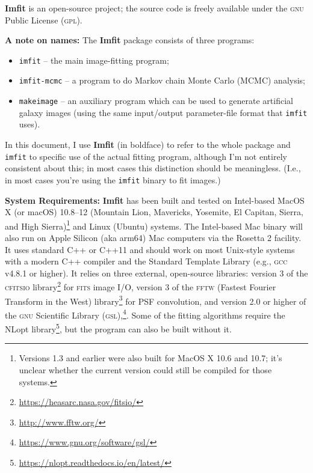 \documentclass[10pt,a4paper,article]{memoir}
\newcommand{\imfit}{\textbf{Imfit}}
\newcommand{\Imfit}{\textbf{Imfit}}
\newcommand{\imfitprog}{\texttt{imfit}}
\newcommand{\imfitmcmc}{\texttt{imfit-mcmc}}
\newcommand{\makeimage}{\texttt{makeimage}}
\begin{document}
\Imfit{} is an open-source project; the source code is freely available
under the \textsc{gnu} Public License (\textsc{gpl}).


\bigskip

\textbf{A note on names:} The \imfit{} package consists of three programs:
\begin{itemize}
\item \imfitprog{} -- the main image-fitting program; \\
\item \imfitmcmc{} -- a program to do Markov chain Monte Carlo (MCMC) analysis; \\
\item \makeimage{} -- an auxiliary program which can be used to
generate artificial galaxy images (using the same input/output
parameter-file format that \imfitprog{} uses). \\
\end{itemize}
In this document, I use \imfit{} (in boldface) to refer to the whole
package and \imfitprog{} to specific use of the actual fitting program,
although I'm not entirely consistent about this; in most cases this
distinction should be meaningless. (I.e., in most cases you're using the
\imfitprog{} binary to fit images.)


\bigskip

\textbf{System Requirements:} \Imfit{} has been built and tested on
Intel-based MacOS X (or macOS) 10.8--12 (Mountain Lion, Mavericks,
Yosemite, El Capitan, Sierra, and High Sierra)\footnote{Versions 1.3 and
earlier were also built for MacOS X 10.6 and 10.7; it's unclear whether
the current version could still be compiled for those systems.} and
Linux (Ubuntu) systems. The Intel-based Mac binary will also run on
Apple Silicon (aka arm64) Mac computers via the Rosetta 2 facility. It
uses standard C++ or C++11 and should work on most Unix-style systems
with a modern C++ compiler and the Standard Template Library (e.g.,
\textsc{gcc} v4.8.1 or higher). It relies on three external, open-source
libraries: version 3 of the \textsc{cfitsio}
library\footnote{\url{https://heasarc.nasa.gov/fitsio/}} for
\textsc{fits} image I/O, version 3 of the \textsc{fftw} (Fastest Fourier
Transform in the West) library\footnote{\url{http://www.fftw.org/}} for
PSF convolution, and version 2.0 or higher of the \textsc{gnu}
Scientific Library
(\textsc{gsl}),\footnote{\url{https://www.gnu.org/software/gsl/}}. Some
of the fitting algorithms require the NLopt
library\footnote{\url{https://nlopt.readthedocs.io/en/latest/}}, but the
program can also be built without it.
\end{document}
